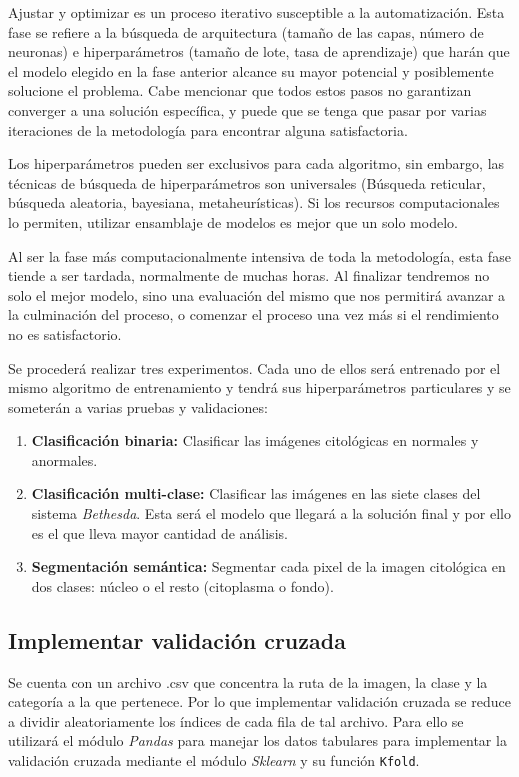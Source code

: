 Ajustar y optimizar es un proceso iterativo susceptible a la automatización.
Esta fase se refiere a la búsqueda de arquitectura (tamaño de las capas, número
de neuronas) e hiperparámetros (tamaño de lote, tasa de aprendizaje) que harán
que el modelo elegido en la fase anterior alcance su mayor potencial y
posiblemente solucione el problema. Cabe mencionar que todos estos pasos no
garantizan converger a una solución específica, y puede que se tenga que pasar
por varias iteraciones de la metodología para encontrar alguna satisfactoria.

Los hiperparámetros pueden ser exclusivos para cada algoritmo, sin embargo, las
técnicas de búsqueda de hiperparámetros son universales (Búsqueda reticular,
búsqueda aleatoria, bayesiana, metaheurísticas). Si los recursos computacionales
lo permiten, utilizar ensamblaje de modelos es mejor que un solo modelo.

Al ser la fase más computacionalmente intensiva de toda la metodología, esta
fase tiende a ser tardada, normalmente de muchas horas. Al finalizar tendremos
no solo el mejor modelo, sino una evaluación del mismo que nos permitirá avanzar
a la culminación del proceso, o comenzar el proceso una vez más si el
rendimiento no es satisfactorio.

Se procederá realizar tres experimentos. Cada uno de ellos será entrenado por el
mismo algoritmo de entrenamiento y tendrá sus hiperparámetros particulares y se
someterán a varias pruebas y validaciones:

\begin{enumerate}
    \item{\textbf{Clasificación binaria:}} Clasificar las imágenes citológicas
    en normales y anormales.
    \item{\textbf{Clasificación multi-clase:}} Clasificar las imágenes en las
    siete clases del sistema \emph{Bethesda}. Esta será el modelo que llegará a
    la solución final y por ello es el que lleva mayor cantidad de análisis.
    \item{\textbf{Segmentación semántica:}} Segmentar cada pixel de la imagen
    citológica en dos clases: núcleo o el resto (citoplasma o fondo).
\end{enumerate}

\subsection{Implementar validación cruzada}

Se cuenta con un archivo .csv que concentra la ruta de la imagen, la clase y la
categoría a la que pertenece. Por lo que implementar validación cruzada se
reduce a dividir aleatoriamente los índices de cada fila de tal archivo. Para
ello se utilizará el módulo \emph{Pandas} para manejar los datos tabulares para
implementar la validación cruzada mediante el módulo \emph{Sklearn} y su función
\texttt{Kfold}.

